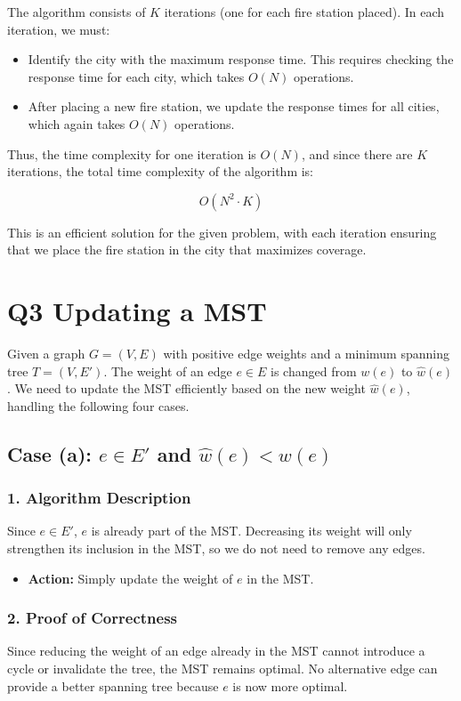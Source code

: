 \documentclass[11pt]{article}
\begin{document}
The algorithm consists of \( K \) iterations (one for each fire station placed). In each iteration, we must:
\begin{itemize}
    \item Identify the city with the maximum response time. This requires checking the response time for each city, which takes \( O(N) \) operations.
    \item After placing a new fire station, we update the response times for all cities, which again takes \( O(N) \) operations.
\end{itemize}

Thus, the time complexity for one iteration is \( O(N) \), and since there are \( K \) iterations, the total time complexity of the algorithm is:

\[
O(N^2 \cdot K)
\]

This is an efficient solution for the given problem, with each iteration ensuring that we place the fire station in the city that maximizes coverage.

\newpage

\section*{Q3 Updating a MST}

Given a graph \( G = (V, E) \) with positive edge weights and a minimum spanning tree \( T = (V, E') \). The weight of an edge \( e \in E \) is changed from \( w(e) \) to \( \hat{w}(e) \). We need to update the MST efficiently based on the new weight \( \hat{w}(e) \), handling the following four cases.

\subsection*{Case (a): \( e \in E' \) and \( \hat{w}(e) < w(e) \)}

\subsubsection*{1. Algorithm Description}
Since \( e \in E' \), \( e \) is already part of the MST. Decreasing its weight will only strengthen its inclusion in the MST, so we do not need to remove any edges.
\begin{itemize}
    \item \textbf{Action:} Simply update the weight of \( e \) in the MST.
\end{itemize}

\subsubsection*{2. Proof of Correctness}
Since reducing the weight of an edge already in the MST cannot introduce a cycle or invalidate the tree, the MST remains optimal. No alternative edge can provide a better spanning tree because \( e \) is now more optimal.
\end{document}
